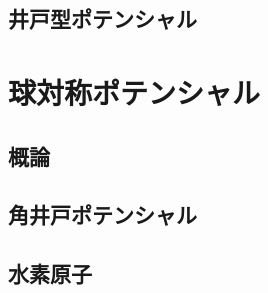 \documentclass[a4j]{jarticle}
\begin{document}
  \subsection{井戸型ポテンシャル}

\section{球対称ポテンシャル}
\subsection{概論}
\subsection{角井戸ポテンシャル}
\subsection{水素原子}
\end{document}
